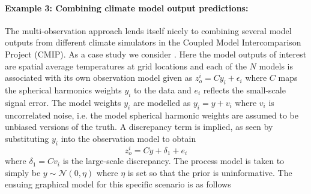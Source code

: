 \documentclass[10pt,a4paper]{article}
\begin{document}
\paragraph{Example 3: Combining climate model output predictions:} The multi-observation approach lends itself nicely to combining several model outputs from different climate simulators in the Coupled Model Intercomparison Project (CMIP). As a case study we consider \cite{Furrer_2007}. Here the model outputs of interest are spatial average temperatures at grid locations and each of the $N$ models is associated with its own observation model given as $z_o^i = Cy_i + \epsilon_i$ where $C$ maps the spherical harmonics weights $y_i$ to the data and $e_i$ reflects the small-scale signal error. The model weights $y_i$ are modelled as $y_i = y + v_i$ where $v_i$ is uncorrelated noise, i.e. the model spherical harmonic weights are assumed to be unbiased versions of the truth. A discrepancy term is implied, as seen by substituting $y_i$ into the observation model to obtain
\begin{equation}
z_o^i = Cy + \delta_1 + e_i
\end{equation}
\noindent where $\delta_1 = Cv_i$ is the large-scale discrepancy. The process model is taken to simply be $y \sim \mathcal{N}(0,\eta)$ where $\eta$ is set so that the prior is uninformative. The ensuing graphical model for this specific scenario is as follows
\begin{figure}[h!]
\centering
{}
\end{figure}
\end{document}
